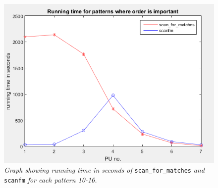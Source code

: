 \documentclass[12pt]{article}
\newcommand{\scm}{\texttt{scan\_for\_matches} }
\newcommand{\sfm}{\texttt{scanfm} }
\begin{document}
\begin{figure}[H]
\begin{center}
\includegraphics[scale=1.0]{Diagrams/optigraf.png}
\end{center}
\caption{\textit{Graph showing running time in seconds of} \scm \textit{and} \sfm \textit{for each pattern 10-16.}}
\end{figure}
\newpage
\printbibliography \newpage
\end{document}
